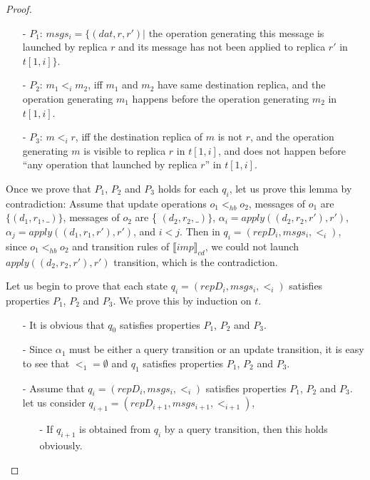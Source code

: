 {\begin {proof}
\begin{itemize}
\setlength{\itemsep}{0.5pt}
\item[-] $P_1$: $msgs_i = \{ (dat,r,r') \vert$ the operation generating this message is launched by replica $r$ and its message has not been applied to replica $r'$ in $t[1,i]\}$.

\item[-] $P_2$: $m_1 <_i m_2$, iff $m_1$ and $m_2$ have same destination replica, and the operation generating $m_1$ happens before the operation generating $m_2$ in $t[1,i]$.

\item[-] $P_3$: $m <_i r$, iff the destination replica of $m$ is not $r$, and the operation generating $m$ is visible to replica $r$ in $t[1,i]$, and does not happen before ``any operation that launched by replica $r$'' in $t[1,i]$.
\end{itemize}

Once we prove that $P_1$, $P_2$ and $P_3$ holds for each $q_i$, let us prove this lemma by contradiction: Assume that update operations $o_1 <_{hb} o_2$, messages of $o_1$ are $\{ (d_1,r_1,\_) \}$, messages of $o_2$ are \{ $(d_2,r_2,\_) \}$, $\alpha_i = apply((d_2,r_2,r'),r')$, $\alpha_j = apply((d_1,r_1,r'),r')$, and $i<j$. Then in $q_i=(repD_i,msgs_i,<_i)$, since $o_1 <_{hb} o_2$ and transition rules of $\llbracket imp \rrbracket_{cd}$, we could not launch $apply((d_2,r_2,r'),r')$ transition, which is the contradiction.



Let us begin to prove that each state $q_i=(repD_i,msgs_i,<_i)$ satisfies properties $P_1$, $P_2$ and $P_3$. We prove this by induction on $t$.

\begin{itemize}
\setlength{\itemsep}{0.5pt}
\item[-] It is obvious that $q_0$ satisfies properties $P_1$, $P_2$ and $P_3$.

\item[-] Since $\alpha_1$ must be either a query transition or an update transition, it is easy to see that $<_1 = \emptyset$ and $q_1$ satisfies properties $P_1$, $P_2$ and $P_3$.

\item[-] Assume that $q_i=(repD_i,msgs_i,<_i)$ satisfies properties $P_1$, $P_2$ and $P_3$. let us consider $q_{i+1}= (repD_{i+1},msgs_{i+1},<_{i+1})$,

    \begin{itemize}
    \setlength{\itemsep}{0.5pt}
    \item[-] If $q_{i+1}$ is obtained from $q_i$ by a query transition, then this holds obviously.


\end{itemize}
\end{itemize}
\end{proof}}
